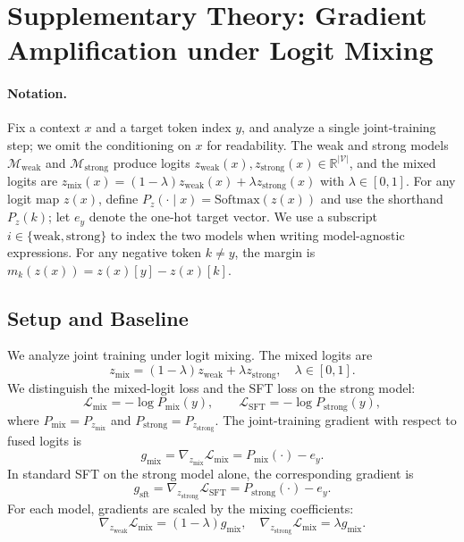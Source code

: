 \newpage
\section{Supplementary Theory: Gradient Amplification under Logit Mixing}
\label{sec:appendix_grad_amp}

\paragraph{Notation.}
Fix a context $x$ and a target token index $y$, and analyze a single joint-training step; we omit the conditioning on $x$ for readability.
The weak and strong models $\mathcal{M}_{\mathrm{weak}}$ and $\mathcal{M}_{\mathrm{strong}}$ produce logits $z_{\mathrm{weak}}(x), z_{\mathrm{strong}}(x) \in \mathbb{R}^{|\mathcal{V}|}$, and the mixed logits are $z_{\text{mix}}(x) = (1-\lambda) z_{\mathrm{weak}}(x) + \lambda z_{\mathrm{strong}}(x)$ with $\lambda \in [0,1]$.
For any logit map $z(x)$, define $P_z(\cdot\mid x)=\mathrm{Softmax}(z(x))$ and use the shorthand $P_z(k)$; let $e_y$ denote the one-hot target vector. We use a subscript $i \in \{\mathrm{weak}, \mathrm{strong}\}$ to index the two models when writing model-agnostic expressions.
For any negative token $k \neq y$, the margin is $m_k(z(x)) = z(x)[y] - z(x)[k]$.

\subsection{Setup and Baseline}
We analyze joint training under logit mixing. The mixed logits are
\begin{equation}
    z_{\text{mix}} = (1-\lambda) z_{\mathrm{weak}} + \lambda z_{\mathrm{strong}}, \quad \lambda \in [0,1].
    \label{eq:appendix_grad_mix}
\end{equation}
We distinguish the mixed-logit loss and the SFT loss on the strong model:
\begin{equation}
    \mathcal{L}_{\mathrm{mix}} = -\log P_{\mathrm{mix}}(y), \qquad
    \mathcal{L}_{\mathrm{SFT}} = -\log P_{\mathrm{strong}}(y),
    \label{eq:appendix_grad_ce}
\end{equation}
where $P_{\mathrm{mix}} = P_{z_{\text{mix}}}$ and $P_{\mathrm{strong}} = P_{z_{\mathrm{strong}}}$.
The joint-training gradient with respect to fused logits is
\begin{equation}
    g_{\text{mix}} = \nabla_{z_{\text{mix}}}\mathcal{L}_{\mathrm{mix}} = P_{\mathrm{mix}}(\cdot) - e_y.
    \label{eq:appendix_grad_residual}
\end{equation}
In standard SFT on the strong model alone, the corresponding gradient is
\begin{equation}
    g_{\text{sft}} = \nabla_{z_{\mathrm{strong}}}\mathcal{L}_{\mathrm{SFT}} = P_{\mathrm{strong}}(\cdot) - e_y.
    \label{eq:appendix_grad_sft}
\end{equation}
For each model, gradients are scaled by the mixing coefficients:
\begin{equation}
    \nabla_{z_{\mathrm{weak}}}\mathcal{L}_{\mathrm{mix}} = (1-\lambda) g_{\text{mix}}, \quad
    \nabla_{z_{\mathrm{strong}}}\mathcal{L}_{\mathrm{mix}} = \lambda g_{\text{mix}}.
    \label{eq:appendix_grad_model}
\end{equation}

